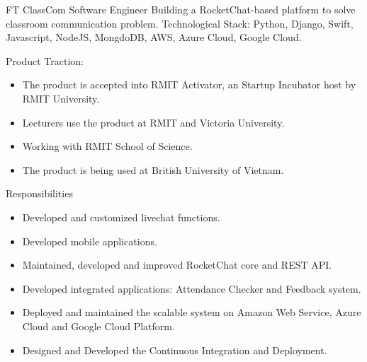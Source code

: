\documentclass[12pt]{article} %
\begin{document}
\begin{paracol}{2}




{FT} %
{ClassCom} %
{Software Engineer} %
{Building a RocketChat-based platform to solve classroom communication problem.} %
{Technological Stack: Python, Django, Swift, Javascript, NodeJS, MongdoDB, AWS, Azure Cloud, Google Cloud.}
{Product Traction: 
	\begin{itemize}
	\setlength{\itemsep}{1pt}	
	  \item The product is accepted into RMIT Activator, an Startup Incubator host by RMIT University.
	  \item Lecturers use the product at RMIT and Victoria University.
	  \item Working with RMIT School of Science.
	  \item The product is being used at British University of Vietnam.  
	\end{itemize}
Responsibilities
	\begin{itemize}
	\setlength{\itemsep}{1pt}	
	  \item Developed and customized livechat functions.
	  \item Developed mobile applications.
	  \item Maintained, developed and improved RocketChat core and REST API.
	  \item Developed integrated applications: Attendance Checker and Feedback system.
	  \item Deployed and maintained the scalable system on Amazon Web Service, Azure Cloud and Google Cloud Platform.
	  \item Designed and Developed the Continuous Integration and Deployment.
	\end{itemize}	
}


\end{paracol}
\end{document}
